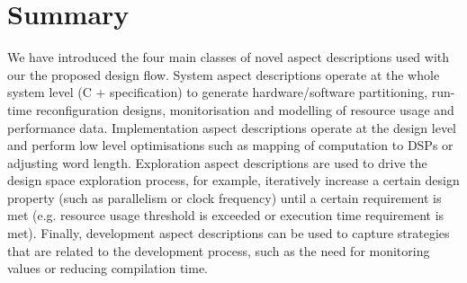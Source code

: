 \section{Summary}

We have introduced the four main classes of novel aspect descriptions
used with our the proposed design flow. System aspect descriptions
operate at the whole system level (C + \FAST{} specification) to
generate hardware/software partitioning, run-time reconfiguration
designs, monitorisation and modelling of resource usage and
performance data.  Implementation aspect descriptions operate at the
design level and perform low level optimisations such as mapping of
computation to DSPs or adjusting word length. Exploration aspect
descriptions are used to drive the design space exploration process,
for example, iteratively increase a certain design property (such as
parallelism or clock frequency) until a certain requirement is met
(e.g. resource usage threshold is exceeded or execution time
requirement is met). Finally, development aspect descriptions can be
used to capture strategies that are related to the development
process, such as the need for monitoring values or reducing
compilation time.
